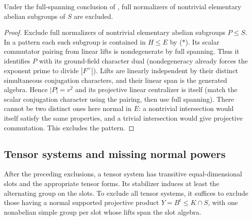 \begin{proposition}\label{c:elementary-normalizers}
Under the full-spanning conclusion of , full normalizers of nontrivial elementary abelian subgroups of \(S\) are excluded.
\end{proposition}

\begin{proof}
Exclude full normalizers of nontrivial elementary abelian subgroups \(P\le S\). In a pattern each such subgroup is contained in \(H\le E\) by (\(*\)). Its scalar commutator pairing from linear lifts is nondegenerate by full spanning. Thus it identifies \(P\) with its ground-field character dual (nondegeneracy already forces the exponent prime to divide \(|F^\times|\)). Lifts are linearly independent by their distinct simultaneous conjugation characters, and their linear span is the generated algebra. Hence \(|P|=v^2\) and its projective linear centralizer is itself (match the scalar conjugation character using the pairing, then use full spanning). There cannot be two distinct ones here normal in \(E\): a nontrivial intersection would itself satisfy the same properties, and a trivial intersection would give projective commutation. This excludes the pattern.
\end{proof}

\subsection{Tensor systems and missing normal powers}

\begin{lemma}\label{c:tensor-simple-slots}
After the preceding exclusions, a tensor system has transitive equal-dimensional slots and the appropriate tensor forms. Its stabilizer induces at least the alternating group on the slots. To exclude all tensor systems, it suffices to exclude those having a normal supported projective product \(Y=B^t\le K\cap S\), with one nonabelian simple group per slot whose lifts span the slot algebra.
\end{lemma}

